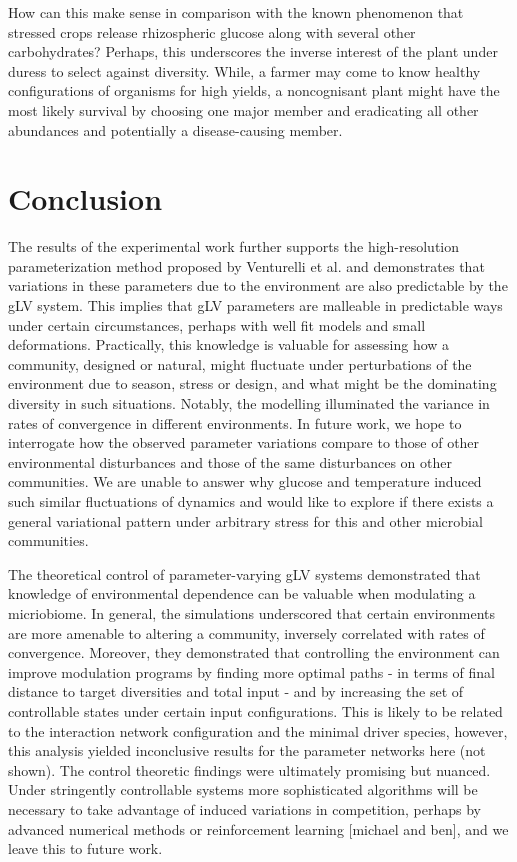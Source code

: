 \documentclass[twocolumn, 10pt]{report}
\begin{document}
{How can this make sense in comparison with the known phenomenon that stressed crops release rhizospheric glucose along with several other carbohydrates? Perhaps, this underscores the inverse interest of the plant under duress to select against diversity. While, a farmer may come to know healthy configurations of organisms for high yields, a noncognisant plant might have the most likely survival by choosing one major member and eradicating all other abundances and potentially a disease-causing member.

\section*{Conclusion}

The results of the experimental work further supports the high-resolution parameterization method proposed by Venturelli et al. and demonstrates that variations in these parameters due to the environment are also predictable by the gLV system. This implies that gLV parameters are malleable in predictable ways under certain circumstances, perhaps with well fit models and small deformations. Practically, this knowledge is valuable for assessing how a community, designed or natural, might fluctuate under perturbations of the environment due to season, stress or design, and what might be the dominating diversity in such situations. Notably, the modelling illuminated the variance in rates of convergence in different environments. In future work, we hope to interrogate how the observed parameter variations compare to those of other environmental disturbances and those of the same disturbances on other communities. We are unable to answer why glucose and temperature induced such similar fluctuations of dynamics and would like to explore if there exists a general variational pattern under arbitrary stress for this and other microbial communities.

The theoretical control of parameter-varying gLV systems demonstrated that knowledge of environmental dependence can be valuable when modulating a micriobiome. In general, the simulations underscored that certain environments are more amenable to altering a community, inversely correlated with rates of convergence. Moreover, they demonstrated that controlling the environment can improve modulation programs by finding more optimal paths - in terms of final distance to target diversities and total input - and by increasing the set of controllable states under certain input configurations. This is likely to be related to the interaction network configuration and the minimal driver species, however, this analysis yielded inconclusive results for the parameter networks here (not shown). The control theoretic findings were ultimately promising but  nuanced. Under stringently controllable systems more sophisticated algorithms will be necessary to take advantage of induced variations in competition, perhaps by advanced numerical methods or reinforcement learning [michael and ben], and we leave this to future work.

}
\end{document}
